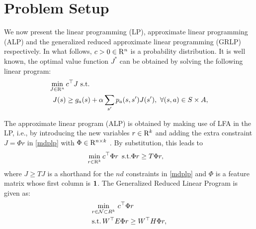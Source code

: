 \section{Problem Setup}
We now present the linear programming (LP), approximate linear programming (ALP) and the generalized reduced approximate linear programming (GRLP) respectively. In what follows, $c>0\in \mathrm{R}^n$ is a probability distribution.
It is well known, the optimal value function $J^*$ can be obtained by solving the following linear program:
\begin{align}\label{mdplp}
\begin{split}
\min_{J\in \R^n}\, &c^\top J\,\,\text{s.t.}\\
J(s)&\geq g_a(s)+\alpha\sum_{s'}p_a(s,s')J(s'),\,\,
\forall (s,a)\in S\times A,
\end{split}
\end{align}
\begin{comment}
When the MDP has a large number of states, it is difficult to solve for $J^*$ using either the linear program \eqref{mdplp} or other full state representation methods such as value iteration or policy ite
ration \cite{BertB}. A practical solution is to resort to function approximation. Linear function approximation, wherein the solution is searched in the subspace spanned by the column vectors of a given feature matrix $\Phi$.\par
\end{comment}
The approximate linear program (ALP) is obtained by making use of LFA in the LP, i.e., by introducing the new variables $r\in \mathrm{R}^k$ and adding the extra constraint $J=\Phi r$ in \eqref{mdplp} with $\Phi \in \mathrm{R}^{n\times k}$ \citep{SchSei85}.
By substitution, this leads to
\begin{align}\label{alp}
\begin{split}
\min_{r\in \R^k}\, &c^\top \Phi r\,\,\,
\text{s.t.}\mb \Phi r\geq T \Phi r,
\end{split}
\end{align}
where $J\geq TJ$ is a shorthand for the $nd$ constraints in \eqref{mdplp} and $\Phi$ is a feature matrix whose first column is $\mathbf{1}$.
The Generalized Reduced Linear Program is given as:
\begin{align}\label{grlp}
\begin{split}
&\underset{r\in \N\subset R^k}{\min}\, \, c^\top \Phi r\,\,\,\,\\
&\text{s.t.}\mb  \,W^\top E\Phi r\geq W^\top H \Phi r,
\end{split}
\end{align}

